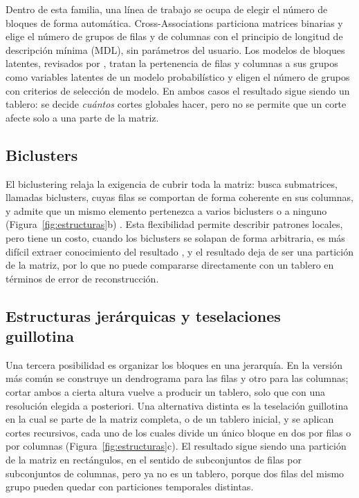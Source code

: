 Dentro de esta familia, una línea de trabajo se ocupa de elegir el número de
bloques de forma automática. Cross-Associations \cite{Chakrabarti2004} particiona
matrices binarias y elige el número de grupos de filas y de columnas con el
principio de longitud de descripción mínima (MDL), sin parámetros del usuario. Los
modelos de bloques latentes, revisados por \cite{Biernacki2023}, tratan la
pertenencia de filas y columnas a sus grupos como variables latentes de un modelo
probabilístico y eligen el número de grupos con criterios de selección de modelo.
En ambos casos el resultado sigue siendo un tablero: se decide \emph{cuántos}
cortes globales hacer, pero no se permite que un corte afecte solo a una parte de
la matriz.

\subsection{Biclusters}

El biclustering relaja la exigencia de cubrir toda la matriz: busca submatrices,
llamadas biclusters, cuyas filas se comportan de forma coherente en sus columnas,
y admite que un mismo elemento pertenezca a varios biclusters o a ninguno
(Figura~\ref{fig:estructuras}b) \cite{Castanho2024}. Esta flexibilidad permite
describir patrones locales, pero tiene un costo, cuando los biclusters se solapan
de forma arbitraria, es más difícil extraer conocimiento del resultado
\cite{Castanho2024}, y el resultado deja de ser una partición de la matriz, por lo
que no puede compararse directamente con un tablero en términos de error de
reconstrucción.

\subsection{Estructuras jerárquicas y teselaciones guillotina}

Una tercera posibilidad es organizar los bloques en una jerarquía. En la versión
más común se construye un dendrograma para las filas y otro para las columnas;
cortar ambos a cierta altura vuelve a producir un tablero, solo que con una
resolución elegida a posteriori. Una alternativa distinta es la teselación
guillotina en la cual se parte de la matriz completa, o de un tablero inicial, y se aplican
cortes recursivos, cada uno de los cuales divide un único bloque en dos por filas
o por columnas (Figura~\ref{fig:estructuras}c). El resultado sigue siendo una
partición de la matriz en rectángulos, en el sentido de subconjuntos de filas por
subconjuntos de columnas, pero ya no es un tablero, porque dos filas del mismo
grupo pueden quedar con particiones temporales distintas.

